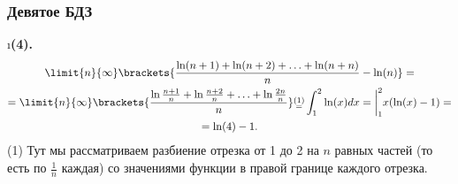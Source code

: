 \subsubsection{Девятое БДЗ}

\setcounter{iii}{15}

\i \textbf{(4).}
\begin{gather*}
    \limit{n}{\infty} \brackets{\frac{\ln(n+1) + \ln(n+2) + \ldots + \ln(n + n)}{n} - \ln(n)} = \\ = \limit{n}{\infty}\brackets{\frac{\ln{\frac{n+1}{n}} + \ln{\frac{n+2}{n}} + \ldots + \ln{\frac{2n}{n}}}{n}} \substack{(1) \\ =} \int_1^2 \ln(x)dx = \bigg|_1^2 x(\ln(x) - 1) = \\ = \ln(4) - 1.
\end{gather*}
(1) Тут мы рассматриваем разбиение отрезка от 1 до 2 на $n$ равных частей (то есть по $\frac{1}{n}$ каждая) со значениями функции в правой границе каждого отрезка.

